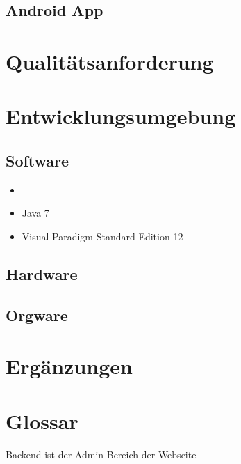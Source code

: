 \documentclass[10pt,a4paper]{article}
\begin{document}
\subsection{Android App}
\section{Qualit\"atsanforderung}

\section{Entwicklungsumgebung}
\subsection{Software}
\begin{itemize}
	\item 
	\item Java 7
	\item Visual Paradigm Standard Edition 12
\end{itemize}
\subsection{Hardware}
\subsection{Orgware}
\section{Erg\"anzungen}

\section{Glossar}

Backend ist der Admin Bereich der Webseite
\end{document}
